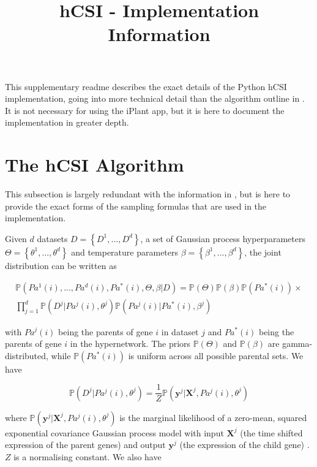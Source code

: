 \documentclass{article}
\title{hCSI - Implementation Information}
\date{}
\begin{document}
\maketitle

This supplementary readme describes the exact details of the Python hCSI implementation, going into more technical detail than the algorithm outline in \citet{penfold2012}. It is not necessary for using the iPlant app, but it is here to document the implementation in greater depth.

\section{The hCSI Algorithm}

This subsection is largely redundant with the information in \citet{penfold2012}, but is here to provide the exact forms of the sampling formulas that are used in the implementation.

Given $d$ datasets $D = \left \{ D^1,...,D^d \right \}$, a set of Gaussian process hyperparameters $\Theta = \left \{ \theta^1,...,\theta^d \right \}$ and temperature parameters $\beta = \left \{ \beta^1,...,\beta^d \right \}$, the joint distribution can be written as

\begin{equation}
\label{dist}
\begin{split}
\mathbb{P}(Pa^1(i),...,Pa^d(i),Pa^*(i),\Theta,\beta|D) = \mathbb{P}(\Theta )\mathbb{P}(\beta )\mathbb{P}(Pa^*(i))\times \\
\prod_{j=1}^{d}\mathbb{P}(D^j|Pa^j(i),\theta ^j)\mathbb{P}(Pa^j(i)|Pa^*(i),\beta ^j)
\end{split}
\end{equation}

with $Pa^j(i)$ being the parents of gene $i$ in dataset $j$ and $Pa^*(i)$ being the parents of gene $i$ in the hypernetwork. The priors $\mathbb{P}(\Theta)$ and $\mathbb{P}(\beta)$ are gamma-distributed, while $\mathbb{P}(Pa^*(i))$ is uniform across all possible parental sets. We have

\begin{equation*}
\mathbb{P}(D^j|Pa^j(i),\theta^j) = \frac{1}{Z}\mathbb{P}(\mathbf{y}^j|\mathbf{X}^j,Pa^j(i),\theta^j)
\end{equation*}

where $\mathbb{P}(\mathbf{y}^j|\mathbf{X}^j,Pa^j(i),\theta^j)$ is the marginal likelihood of a zero-mean, squared exponential covariance Gaussian process model with input $\mathbf{X}^j$ (the time shifted expression of the parent genes) and output $\mathbf{y}^j$ (the expression of the child gene) \citep{rasmussen2006}. $Z$ is a normalising constant. We also have
\end{document}
